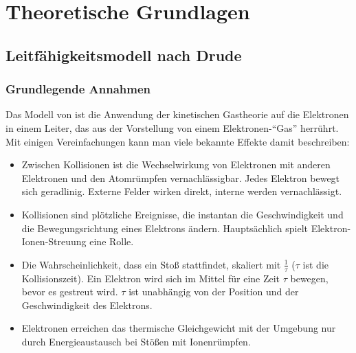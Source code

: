 \documentclass[pointlessnumbers,headsepline,twoside,11pt,DIV14,BCOR15mm,halfparskip,a4paper,appendixprefix]{scrreprt}
\begin{document}
\chapter{Theoretische Grundlagen}
	\label{chap:theo}
\section{Leitfähigkeitsmodell nach Drude}
\subsection{Grundlegende Annahmen}
Das Modell von  ist die Anwendung der kinetischen Gastheorie auf die Elektronen in einem Leiter, das aus der Vorstellung von einem Elektronen-"`Gas"' herrührt. Mit einigen Vereinfachungen kann man viele bekannte Effekte damit beschreiben:
\begin{itemize}
    \item Zwischen Kollisionen ist die Wechselwirkung von Elektronen mit anderen Elektronen und den Atomrümpfen vernachlässigbar. Jedes Elektron bewegt sich geradlinig. Externe Felder wirken direkt, interne werden vernachlässigt.

    \item Kollisionen sind plötzliche Ereignisse, die instantan die Geschwindigkeit und die Bewegungsrichtung eines Elektrons ändern. Hauptsächlich spielt Elektron-Ionen-Streuung eine Rolle.

    \item Die Wahrscheinlichkeit, dass ein Stoß stattfindet, skaliert mit $\frac1\tau$ ($\tau$ ist die Kollisionszeit). Ein Elektron wird sich im Mittel für eine Zeit $\tau$ bewegen, bevor es gestreut wird. $\tau$ ist unabhängig von der Position und der Geschwindigkeit des Elektrons.

    \item Elektronen erreichen das thermische Gleichgewicht mit der Umgebung nur durch Energieaustausch bei Stößen mit Ionenrümpfen.
\end{itemize}
\end{document}
